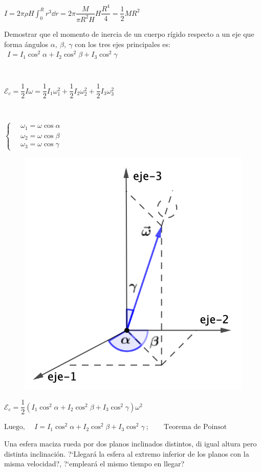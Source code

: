 $\displaystyle I=2\pi \rho  H \int_0^R r^3 \dd r = 2 \pi \dfrac{M}{\pi R^2 H}H \dfrac{R^4}{4}=\dfrac 1 2 M R^2$

\begin{prob}
Demostrar que el momento de inercia	de un cuerpo rígido respecto a un eje que forma ángulos $\alpha,\ \beta,\ \gamma$ con los tres ejes principales es:
$\ \ I=I_1 \cos^2 \alpha + I_2 \cos^2 \beta + I_3 \cos^2 \gamma$
\end{prob}
\begin{multicols}{2}
$\quad$

$\mathcal E_c=\dfrac 1 2 I\omega = \dfrac 1 2 I_1 \omega_1^2+\dfrac 1 2 I_2 \omega_2^2+\dfrac 1 2 I_3 \omega_3^2$

$\quad$

$\begin{cases}
\quad \omega_1=\omega \cos \alpha \\
\quad\omega_2=\omega \cos \beta \\
\quad \omega_3=\omega \cos \gamma
\end{cases}$

\begin{figure}[H]
	\centering
	\includegraphics[width=.45\textwidth]{imagenes/imagenes16/T16IM23.png}
\end{figure}	
\end{multicols}
\vspace{-3mm} %
$\mathcal E_c=\dfrac 1 2 \left( I_1 \cos^2 \alpha + I_2 \cos^2 \beta + I_3 \cos^2 \gamma \right)\omega^2$

$\text{Luego, } \quad   I=I_1 \cos^2 \alpha + I_2 \cos^2 \beta + I_3 \cos^2 \gamma \ ; \qquad \text{Teorema de Poinsot}$

\begin{prob}
Una esfera maciza rueda por dos planos inclinados distintos, di igual altura pero distinta inclinación.	?`Llegará la esfera al extremo inferior de los planos con la misma velocidad?, ?`empleará el mismo tiempo en llegar?
\end{prob}

